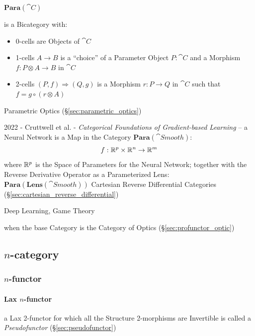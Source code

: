 $\mathbf{Para}(\cat{C})$

is a Bicategory with:
\begin{itemize}
  \item 0-cells are Objects of $\cat{C}$
  \item 1-cells $A \to B$ is a ``choice'' of a Parameter Object $P : \cat{C}$
    and a Morphism $f : P \otimes A \to B$ in $\cat{C}$
  \item 2-cells $(P, f) \Rightarrow (Q, g)$ is a Morphism $r : P \to Q$ in
    $\cat{C}$ such that $f = g \circ (r \otimes A)$
\end{itemize}

Parametric Optics (\S\ref{sec:parametric_optics})

2022 - Cruttwell et al. -
\emph{Categorical Foundations of Gradient-based Learning} -- a Neural Network is
a Map in the Category $\mathbf{Para}(\cat{Smooth})$:
\[
  f : \mathbb{R}^p \times \mathbb{R}^n \to \mathbb{R}^m
\]
where $\mathbb{R}^p$ is the Space of Parameters for the Neural Network; together
with the Reverse Derivative Operator as a Parameterized Lens:
$\mathbf{Para}(\mathbf{Lens}(\cat{Smooth}))$ \fist Cartesian Reverse
Differential Categories (\S\ref{sec:cartesian_reverse_differential})

Deep Learning, Game Theory

when the base Category is the Category of Optics (\S\ref{sec:profunctor_optic})



\subsection{$n$-category}\label{sec:n_category}

\subsubsection{$n$-functor}\label{sec:n_functor}

\paragraph{Lax $n$-functor}\label{sec:lax_n_functor}\hfill

a Lax 2-functor for which all the Structure 2-morphisms are Invertible is called
a \emph{Pseudofunctor} (\S\ref{sec:pseudofunctor})

